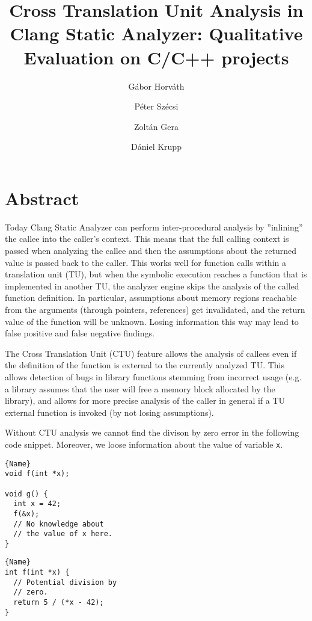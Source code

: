 \documentclass[sigconf]{acmart}
\title{Cross Translation Unit Analysis in Clang Static Analyzer: Qualitative Evaluation on C/C++ projects}
\author{G\'abor Horv\'ath}
\author{P\'eter Sz\'ecsi}
\author{Zolt\'an Gera}
\affiliation{%
  \institution{E\"otv\"os Lor\'and University, Department of Programming Languages and Compilers}
  \streetaddress{P\'azm\'any P\'eter st. 1/C.}
  \city{Budapest} 
  \country{Hungary} 
}
\author{D\'aniel Krupp}
\affiliation{%
  \institution{Ericsson Ltd.}
  \streetaddress{Magyar Tud\'osok k\"or\'utja 11.}
  \city{Budapest}
  \country{Hungary}
}
\begin{document}
\maketitle


\section{Abstract}
Today Clang Static Analyzer can perform inter-procedural analysis by ''inlining'' 
the callee into the caller's context. This means that the full 
calling context is passed when analyzing the callee and
then the assumptions about the returned value is passed back to the caller. 
This works well for function calls within a
translation unit (TU), but when the symbolic execution reaches a function that 
is implemented in another TU, the analyzer engine 
skips the analysis of the called function definition. In particular,
assumptions about memory regions reachable from the arguments 
(through pointers, references) get invalidated, 
and the return value of the function will be unknown.
Losing information this way may lead to false positive
and false negative findings.

The Cross Translation Unit (CTU) feature allows the analysis of callees
even if the definition of the function is external to the currently 
analyzed TU. This allows detection of bugs in library functions stemming
from incorrect usage (e.g. a library assumes that the user will free a memory 
block allocated by the library), and allows for more precise analysis
of the caller in general if a TU external function is invoked
(by not losing assumptions).

Without CTU analysis we cannot find the divison by zero error in the following 
code snippet. Moreover, we loose information about the value of variable
\texttt{x}.

\noindent\begin{minipage}{.48\columnwidth}
\begin{lstlisting}[caption=A.cpp,frame=tlrb]{Name}
void f(int *x);

void g() {
  int x = 42;
  f(&x);
  // No knowledge about
  // the value of x here.
}
\end{lstlisting}
\end{minipage}\hfill
\begin{minipage}{.48\columnwidth}
\begin{lstlisting}[caption=B.cpp,frame=tlrb]{Name}
int f(int *x) {
  // Potential division by
  // zero.
  return 5 / (*x - 42);
}
\end{lstlisting}
\end{minipage}
\end{document}
